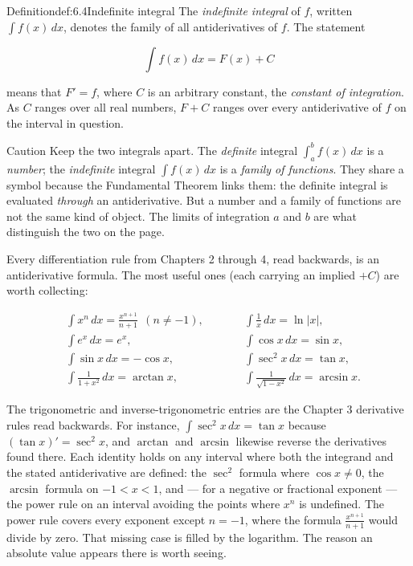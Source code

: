 \documentclass[a4paper,12pt,oneside]{memoir}
\begin{document}
\begin{envdefinition}{Definition}{def:6.4}{Indefinite integral}
The \emph{indefinite integral} of \(f\), written \(\int f(x)\,dx\), denotes the family of all antiderivatives of \(f\). The statement

\[ \int f(x)\,dx = F(x) + C \]

means that \(F' = f\), where \(C\) is an arbitrary constant, the \emph{constant of integration}. As \(C\) ranges over all real numbers, \(F + C\) ranges over every antiderivative of \(f\) on the interval in question.
\end{envdefinition}
\begin{envcaution}{Caution}{}{}
Keep the two integrals apart. The \emph{definite} integral \(\int_{a}^{b} f(x)\,dx\) is a \emph{number}; the \emph{indefinite} integral \(\int f(x)\,dx\) is a \emph{family of functions}. They share a symbol because the Fundamental Theorem links them: the definite integral is evaluated \emph{through} an antiderivative. But a number and a family of functions are not the same kind of object. The limits of integration \(a\) and \(b\) are what distinguish the two on the page.
\end{envcaution}
Every differentiation rule from Chapters 2 through 4, read backwards, is an antiderivative formula. The most useful ones (each carrying an implied \(+C\)) are worth collecting:

\[ \begin{aligned}
    &\int x^{n}\,dx = \frac{x^{n+1}}{n+1} \ \ (n \ne -1), &\qquad &\int \frac{1}{x}\,dx = \ln\lvert x\rvert, \\[4pt]
    &\int e^{x}\,dx = e^{x}, &\qquad &\int \cos x\,dx = \sin x, \\[4pt]
    &\int \sin x\,dx = -\cos x, &\qquad &\int \sec^{2} x\,dx = \tan x, \\[4pt]
    &\int \frac{1}{1 + x^{2}}\,dx = \arctan x, &\qquad &\int \frac{1}{\sqrt{1 - x^{2}}}\,dx = \arcsin x.
  \end{aligned} \]

The trigonometric and inverse-trigonometric entries are the Chapter 3 derivative rules read backwards. For instance, \(\int \sec^{2} x\,dx = \tan x\) because \((\tan x)' = \sec^{2} x\), and \(\arctan\) and \(\arcsin\) likewise reverse the derivatives found there. Each identity holds on any interval where both the integrand and the stated antiderivative are defined: the \(\sec^{2}\) formula where \(\cos x \ne 0\), the \(\arcsin\) formula on \(-1 < x < 1\), and — for a negative or fractional exponent — the power rule on an interval avoiding the points where \(x^{n}\) is undefined. The power rule covers every exponent except \(n = -1\), where the formula \(\tfrac{x^{n+1}}{n+1}\) would divide by zero. That missing case is filled by the logarithm. The reason an absolute value appears there is worth seeing.
\end{document}
